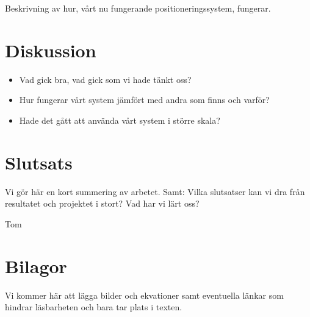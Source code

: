 \documentclass[11pt, a4paper]{report}
\begin{document}
Beskrivning av hur, vårt nu fungerande positioneringssystem, fungerar. 

\chapter{Diskussion}
\begin{itemize}
\item Vad gick bra, vad gick som vi hade tänkt oss?
\item Hur fungerar vårt system jämfört med andra som finns och varför?
\item Hade det gått att använda vårt system i större skala?
\end{itemize} 




\chapter{Slutsats}
Vi gör här en kort summering av arbetet.
Samt:
Vilka slutsatser kan vi dra från resultatet och projektet i stort?
Vad har vi lärt oss?






\newpage
\begin{thebibliography}{99}

 Tom

\end{thebibliography}

\chapter{Bilagor}
Vi kommer här att lägga bilder och ekvationer samt eventuella länkar som hindrar läsbarheten och bara tar plats i texten.
\end{document}
